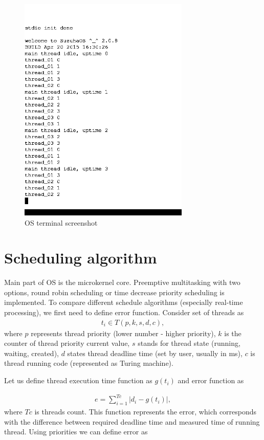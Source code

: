 \documentclass[a4paper, conference]{IEEEtran}
\begin{document}
\begin{figure}[!t]
\centering
\includegraphics[width=3.2in]{threads.png}
\caption{OS terminal screenshot}
\label{fig_os_terminal}
\end{figure}

\section{Scheduling algorithm}

Main part of OS is the microkernel core. Preemptive multitasking with two options, round robin scheduling or time decrease
priority scheduling is implemented. To compare different schedule algorithms (especially real-time processing), we first need to define error function. Consider set of threads as 
\begin{align}
\label{thread}
t_i \in T(p, k, s, d, c) ,
\end{align}
where
$p$ represents thread priority (lower number - higher priority),
$k$ is the counter of thread priority current value,
$s$ stands for thread state (running, waiting, created),
$d$ states thread deadline time (set by user, usually in ms),
$c$ is thread running code (represented as Turing machine).

Let us define thread execution time function as $g(t_i)$ and error function as 

\begin{align}
e = \sum_{i=1}^{Tc} |d_i - g(t_i)| ,
\end{align}
where $Tc$ is threads count. This function represents the error, which corresponds with the difference between required deadline time and measured time of running thread.
Using priorities we can define error as
\end{document}
